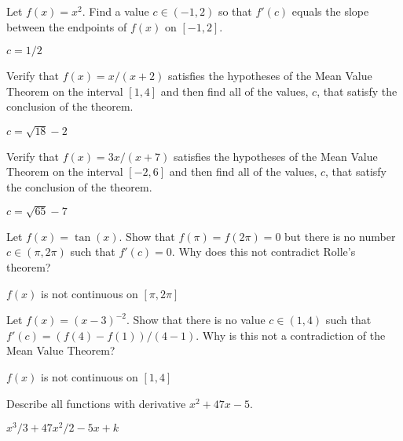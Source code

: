 \begin{exercises}

\begin{exercise} Let $f(x) = x^2$.
Find a value $c\in (-1,2)$ so that $f'(c)$ equals the slope between
the endpoints of $f(x)$ on $[-1,2]$.
\begin{answer} $c=1/2$
\end{answer}\end{exercise}

\begin{exercise} 
Verify that $f(x) = x/(x+2)$ satisfies the hypotheses of the Mean
Value Theorem on the interval $[1,4]$ and then find all of the values,
$c$, that satisfy the conclusion of the theorem.
\begin{answer} $c=\sqrt{18}-2$
\end{answer}
\end{exercise}

\begin{exercise}
Verify that $f(x) = 3x/(x+7)$ satisfies the hypotheses of the Mean
Value Theorem on the interval $[-2 , 6]$ and then find all of the
values, $c$, that satisfy the conclusion of the theorem.
\begin{answer} $c=\sqrt{65}-7$
\end{answer}
\end{exercise}

\begin{exercise} 
Let $f(x) = \tan(x)$. Show that $f(\pi ) = f(2\pi)=0$ but there is no
number $c\in (\pi,2\pi)$ such that $f'(c) =0$. Why does this not
contradict Rolle's theorem?
\begin{answer} $f(x)$ is not continuous on $[\pi,2\pi]$
\end{answer}
\end{exercise}

\begin{exercise} Let $f(x) = (x-3)^{-2}$.  Show that there is no value 
$c\in (1,4)$ such that $f'(c) = (f(4)-f(1))/(4-1)$.  Why is
this not a contradiction of the Mean Value Theorem?
\begin{answer} $f(x)$ is not continuous on $[1,4]$
\end{answer}
\end{exercise}

\begin{exercise} Describe all functions with derivative $x^2+47x-5$.
\begin{answer} $x^3/3+47x^2/2-5x+k$
\end{answer}\end{exercise}


\end{exercises}
